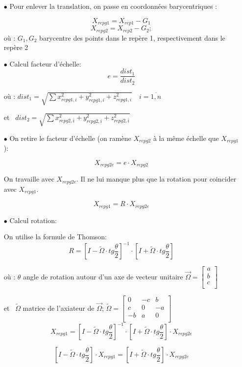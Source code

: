 \documentclass[french]{report}
\begin{document}
\begin{itemize}
\item[$\bullet$]Pour enlever la translation, on passe en coordonnées barycentriques :

$$X_{repg1}=X_{rep1}-G_1$$
$$X_{repg2}=X_{rep2}-G_2;$$
où : $G_1, G_2$ barycentre des points dans le repère 1, respectivement dans le repère 2

\item[$\bullet$]Calcul facteur d'échelle:
$${e}=\frac{dist_1}{dist_2}$$

où : $dist_1=\sqrt{ \sum{x_{repg1,i}^2 +y_{repg1,i}^2 + z_{repg1,i}^2}} \quad i=\overline{1,n}$

et \ $dist_2=\sqrt{ \sum{x_{repg2,i}^2 +y_{repg2,i}^2 + z_{repg2,i}^2}}$
\\
\item[$\bullet$]On retire le facteur d'échelle (on ramène $X_{repg2}$ à la même échelle que $X_{repg1}$):

$$X_{repg2e}=e \cdot X_{repg2} $$

On travaille avec $X_{repg2e}$. Il ne lui manque plus que la rotation pour coincider avec $X_{repg1}$.

$$X_{repg1}= R \cdot X_{repg2e}$$

\item[$\bullet$]Calcul rotation:

On utilise la formule de Thomson:
$$R=[I-\widetilde\Omega \cdot tg \frac{\theta}{2}]^{-1} \cdot [I+\widetilde\Omega \cdot tg \frac{\theta}{2}]$$

où : $\theta$ angle de rotation autour d'un axe de vecteur unitaire $\vec{\Omega}=\begin{bmatrix} a\\b\\c\\ \end{bmatrix}$

et \ $\widetilde\Omega$ matrice de l'axiateur de $\vec{\Omega}$; \quad
$\widetilde\Omega=\begin{bmatrix} 0 & -c & b \\
c & 0 & -a\\
-b & a & 0\\ \end{bmatrix} $
\newline
\newline
$$X_{repg1}=[I-\widetilde\Omega \cdot tg \frac{\theta}{2}]^{-1} \cdot [I+\widetilde\Omega \cdot tg \frac{\theta}{2}]\cdot X_{repg2e}$$

$$[I-\widetilde\Omega \cdot tg \frac{\theta}{2}] \cdot X_{repg1}=[I+\widetilde\Omega \cdot tg \frac{\theta}{2}]\cdot X_{repg2e}$$


\end{itemize}
\end{document}
